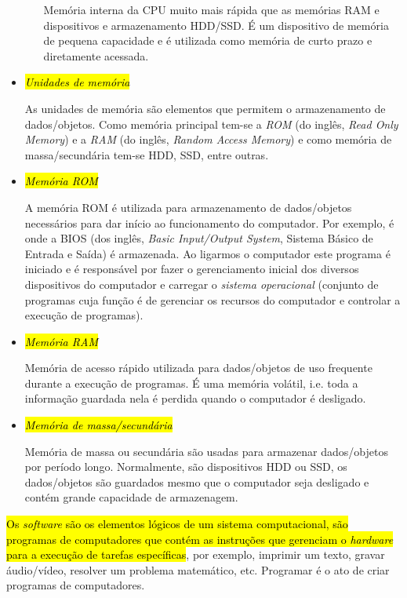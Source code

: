 \begin{itemize}
\begin{itemize}
    Memória interna da CPU muito mais rápida que as memórias RAM e dispositivos e armazenamento HDD/SSD. É um dispositivo de memória de pequena capacidade e é utilizada como memória de curto prazo e diretamente acessada.
  \end{itemize}

\item \hl{\emph{Unidades de memória}}

  As unidades de memória são elementos que permitem o armazenamento de dados/objetos. Como memória principal tem-se a \emph{ROM} (do inglês, {\it Read Only Memory}) e a \emph{RAM} (do inglês, {\it Random Access Memory}) e como memória de massa/secundária tem-se HDD, SSD, entre outras.

\item \hl{\emph{Memória ROM}}

  A memória ROM é utilizada para armazenamento de dados/objetos necessários para dar início ao funcionamento do computador. Por exemplo, é onde a BIOS (dos inglês, {\it Basic Input/Output System}, Sistema Básico de Entrada e Saída) é armazenada. Ao ligarmos o computador este programa é iniciado e é responsável por fazer o gerenciamento inicial dos diversos dispositivos do computador e carregar o \emph{sistema operacional} (conjunto de programas cuja função é de gerenciar os recursos do computador e controlar a execução de programas).

\item \hl{\emph{Memória RAM}}

  Memória de acesso rápido utilizada para dados/objetos de uso frequente durante a execução de programas. É uma memória volátil, i.e. toda a informação guardada nela é perdida quando o computador é desligado.

\item \hl{\emph{Memória de massa/secundária}}

  Memória de massa ou secundária são usadas para armazenar dados/objetos por período longo. Normalmente, são dispositivos HDD ou SSD, os dados/objetos são guardados mesmo que o computador seja desligado e contém grande capacidade de armazenagem.   
\end{itemize}

\hl{Os \emph{software} são os elementos lógicos de um sistema computacional, são programas de computadores que contém as instruções que gerenciam o \emph{hardware} para a execução de tarefas específicas}, por exemplo, imprimir um texto, gravar áudio/vídeo, resolver um problema matemático, etc. Programar é o ato de criar programas de computadores.

